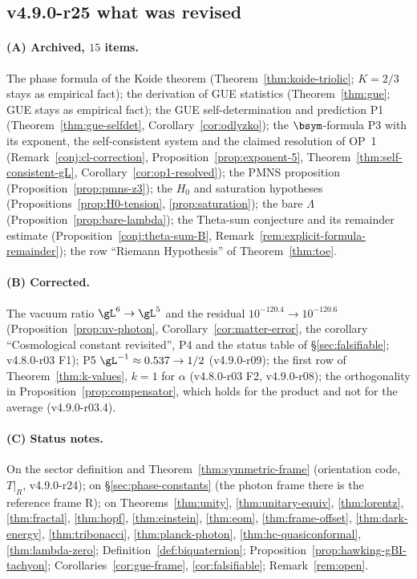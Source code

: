 \subsection*{v4.9.0-r25 what was revised}
\label{subsec:v490-r25-what}

\paragraph{(A) Archived, \(15\) items.}
The phase formula of the Koide theorem (Theorem~\ref{thm:koide-triolic}; \(K=2/3\) stays as empirical fact); the derivation of
GUE statistics (Theorem~\ref{thm:gue}; GUE stays as empirical fact); the GUE self-determination and prediction P1
(Theorem~\ref{thm:gue-selfdet}, Corollary~\ref{cor:odlyzko}); the \(\bsym\)-formula P3 with its exponent, the self-consistent
system and the claimed resolution of OP~1 (Remark~\ref{conj:cl-correction}, Proposition~\ref{prop:exponent-5},
Theorem~\ref{thm:self-consistent-gL}, Corollary~\ref{cor:op1-resolved}); the PMNS proposition
(Proposition~\ref{prop:pmns-z3}); the \(H_0\) and saturation hypotheses (Propositions~\ref{prop:H0-tension},
\ref{prop:saturation}); the bare \(\Lambda\) (Proposition~\ref{prop:bare-lambda}); the Theta-sum conjecture and its remainder
estimate (Proposition~\ref{conj:theta-sum-B}, Remark~\ref{rem:explicit-formula-remainder}); the row ``Riemann Hypothesis'' of
Theorem~\ref{thm:toe}.

\paragraph{(B) Corrected.}
The vacuum ratio \(\gL^6\to\gL^5\) and the residual \(10^{-120.4}\to10^{-120.6}\) (Proposition~\ref{prop:uv-photon},
Corollary~\ref{cor:matter-error}, the corollary ``Cosmological constant revisited'', P4 and the status table of
\S\ref{sec:falsifiable}; v4.8.0-r03 F1); P5 \(\gL^{-1}\approx0.537\to1/2\) (v4.9.0-r09); the first row of
Theorem~\ref{thm:k-values}, \(k=1\) for \(\alpha\) (v4.8.0-r03 F2, v4.9.0-r08); the orthogonality in
Proposition~\ref{prop:compensator}, which holds for the product and not for the average (v4.9.0-r03.4).

\paragraph{(C) Status notes.}
On the sector definition and Theorem~\ref{thm:symmetric-frame} (orientation code, \(T|_R\), v4.9.0-r24); on
\S\ref{sec:phase-constants} (the photon frame there is the reference frame R); on Theorems~\ref{thm:unity},
\ref{thm:unitary-equiv}, \ref{thm:lorentz}, \ref{thm:fractal}, \ref{thm:hopf}, \ref{thm:einstein}, \ref{thm:eom},
\ref{thm:frame-offset}, \ref{thm:dark-energy}, \ref{thm:tribonacci}, \ref{thm:planck-photon}, \ref{thm:hc-quasiconformal},
\ref{thm:lambda-zero}; Definition~\ref{def:biquaternion}; Proposition~\ref{prop:hawking-gBI-tachyon};
Corollaries~\ref{cor:gue-frame}, \ref{cor:falsifiable}; Remark~\ref{rem:open}.

